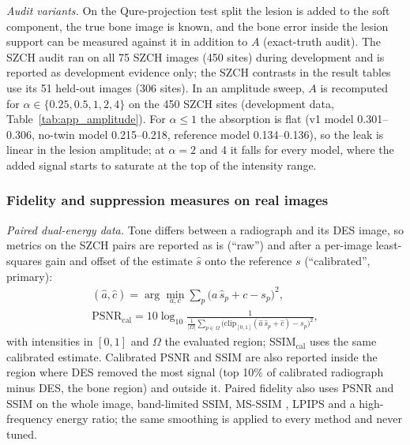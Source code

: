 \emph{Audit variants.} On the Qure-projection test split the lesion is added to the soft component, the true bone image is known, and the
bone error inside the lesion support can be measured against it in addition to $A$ (exact-truth audit). The SZCH audit ran on all 75 SZCH
images (450 sites) during development and is reported as development evidence only; the SZCH contrasts in the result tables use its 51
held-out images (306 sites). In an amplitude sweep, $A$ is recomputed for $\alpha\in\{0.25,0.5,1,2,4\}$ on the 450 SZCH sites
(development data, Table~\ref{tab:app_amplitude}). For $\alpha\le1$ the absorption is flat (v1 model 0.301--0.306, no-twin model
0.215--0.218, reference model 0.134--0.136), so the leak is linear in the lesion amplitude; at $\alpha=2$ and 4 it falls for every model,
where the added signal starts to saturate at the top of the intensity range.

\subsubsection{Fidelity and suppression measures on real images}
\label{sec:m-fidelity}
\emph{Paired dual-energy data.} Tone differs between a radiograph and its DES image, so metrics on the SZCH pairs are reported as is
(``raw'') and after a per-image least-squares gain and offset of the estimate $\hat s$ onto the reference $s$ (``calibrated'', primary):
\begin{equation}
\begin{gathered}
(\hat a,\hat c)=\arg\min_{a,c}\sum_p\big(a\,\hat s_p+c-s_p\big)^2,\\
\mathrm{PSNR}_{\mathrm{cal}}=10\log_{10}\frac{1}{\frac{1}{|\Omega|}\sum_{p\in\Omega}\big(\mathrm{clip}_{[0,1]}(\hat a\,\hat s_p+\hat c)-s_p\big)^2},
\end{gathered}
\label{eq:psnrcal}
\end{equation}
with intensities in $[0,1]$ and $\Omega$ the evaluated region; SSIM$_{\mathrm{cal}}$ uses the same calibrated estimate. Calibrated PSNR and
SSIM are also reported inside the region where DES removed the most signal (top 10\% of calibrated radiograph minus DES, the bone region)
and outside it. Paired fidelity also uses PSNR and SSIM \cite{wang2004ssim} on the whole image, band-limited SSIM, MS-SSIM
\cite{wang2003msssim}, LPIPS \cite{zhang2018lpips} and a high-frequency energy ratio; the same smoothing is applied to every method and never
tuned.

